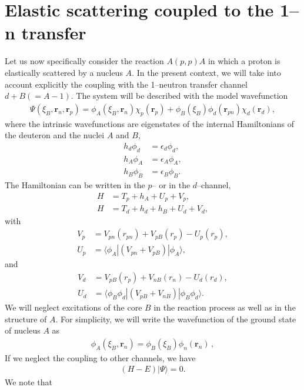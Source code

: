 \documentclass[a4paper,11pt]{article}
\newcommand{\braket}[1]{\langle {#1} \rangle }
\newcommand{\ket}[1]{|{#1} \rangle }
\begin{document}
\section{Elastic scattering coupled to the 1--n transfer}
Let us now specifically consider the reaction $A(p,p)A$ in which a proton is elastically scattered by a nucleus $A$. In the present context, we will take into account explicitly the coupling with the 1--neutron transfer channel $d+B(=A-1)$. The system will be described with the model wavefunction
\begin{align}\label{eq15}
\Psi(\xi_B,\mathbf  r_n,\mathbf r_p)=\phi_A(\xi_B,\mathbf r_n)\chi_p(\mathbf r_p)+\phi_B(\xi_B)\phi_d(\mathbf r_{pn})\chi_d(\mathbf r_d),
\end{align} 
where the intrinsic wavefunctions are eigenstates of the internal Hamiltonians of the deuteron and the nuclei $A$ and $B$,
\begin{align}\label{eq18}
\nonumber h_d\phi_d&=\epsilon_d\phi_d,\\
\nonumber h_A\phi_A&=\epsilon_A\phi_A,\\
h_B\phi_B&=\epsilon_B\phi_B.
\end{align} 
The Hamiltonian can be written in the $p$-- or in the $d$--channel,
\begin{align}\label{eq14}
\nonumber H&=T_p+h_A+U_p+V_p,\\
H&=T_d+h_d+h_B+U_d+V_d,
\end{align}
with
\begin{align}\label{eq16}
\nonumber V_p&=V_{pn}(r_{pn})+V_{pB}(r_p)-U_p(r_p),\\
U_p&=\braket{\phi_A|(V_{pn}+V_{pB})|\phi_A},
\end{align}
and
\begin{align}\label{eq17}
\nonumber V_d&=V_{pB}(r_p)+V_{nB}(r_n)-U_d(r_d),\\
U_d&=\braket{\phi_B\phi_d|(V_{pB}+V_{nB})|\phi_B\phi_d}.
\end{align}
We will neglect excitations of the core $B$ in the reaction process as well as in the structure of $A$. For simplicity, we will write the wavefunction of the ground state of nucleus $A$  as
\begin{align}
\nonumber \phi_A(\xi_B,\mathbf r_n)=\phi_B(\xi_B)\phi_n(\mathbf r_n)\,,
\end{align}
 If we neglect the coupling to other channels, we have
\begin{align}\label{eq19}
\left(H-E\right)\ket{\Psi}=0.
\end{align}
We note  that
\end{document}
